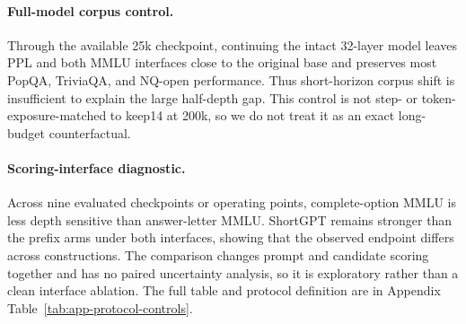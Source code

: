 \paragraph{Full-model corpus control.}
Through the available 25k checkpoint, continuing the intact 32-layer
model leaves PPL and both MMLU interfaces close to the original base and
preserves most PopQA, TriviaQA, and NQ-open performance. Thus short-horizon
corpus shift is insufficient to explain the large half-depth gap. This control
is not step- or token-exposure-matched to keep14 at 200k, so we do not treat it
as an exact long-budget counterfactual.

\paragraph{Scoring-interface diagnostic.}
Across nine evaluated checkpoints or operating points, complete-option MMLU is
less depth sensitive than
answer-letter MMLU. ShortGPT remains stronger than the prefix arms under both
interfaces, showing that the observed endpoint differs across constructions.
The comparison changes prompt and candidate scoring together and has no paired
uncertainty analysis, so it is exploratory rather than a clean interface
ablation. The full table and protocol definition are in Appendix
Table~\ref{tab:app-protocol-controls}.
